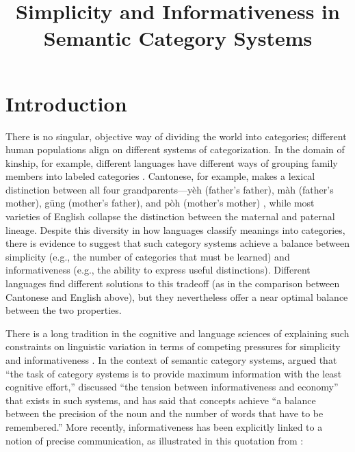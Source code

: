 \documentclass[doc,biblatex]{apa7}
\title{Simplicity and Informativeness in Semantic Category Systems}
\begin{document}
\maketitle

\section{Introduction}

There is no singular, objective way of dividing the world into categories; different human populations align on different systems of categorization. In the domain of kinship, for example, different languages have different ways of grouping family members into labeled categories \parencite{Murdock:1970}. Cantonese, for example, makes a lexical distinction between all four grandparents---y\`{e}h (father's father), m\`{a}h (father's mother), g\={u}ng (mother's father), and p\`{o}h (mother's mother) \parencite{Cheung:1990}, while most varieties of English collapse the distinction between the maternal and paternal lineage. Despite this diversity in how languages classify meanings into categories, there is evidence to suggest that such category systems achieve a balance between simplicity (e.g., the number of categories that must be learned) and informativeness (e.g., the ability to express useful distinctions). Different languages find different solutions to this tradeoff (as in the comparison between Cantonese and English above), but they nevertheless offer a near optimal balance between the two properties.

There is a long tradition in the cognitive and language sciences of explaining such constraints on linguistic variation in terms of competing pressures for simplicity and informativeness \parencite[e.g.,][]{Gabelentz:1891,Zipf:1949,Martinet:1952}. In the context of semantic category systems, \textcite[p.~28]{Rosch:1978} argued that ``the task of category systems is to provide maximum information with the least cognitive effort,'' \textcite[p.~502]{Komatsu:1992} discussed ``the tension between informativeness and economy'' that exists in such systems, and \textcite[p.~132--133]{Gardenfors:2014} has said that concepts achieve ``a balance between the precision of the noun and the number of words that have to be remembered.'' More recently, informativeness has been explicitly linked to a notion of precise communication, as illustrated in this quotation from \textcite[][p.~111]{Kemp:2018}:
\end{document}

